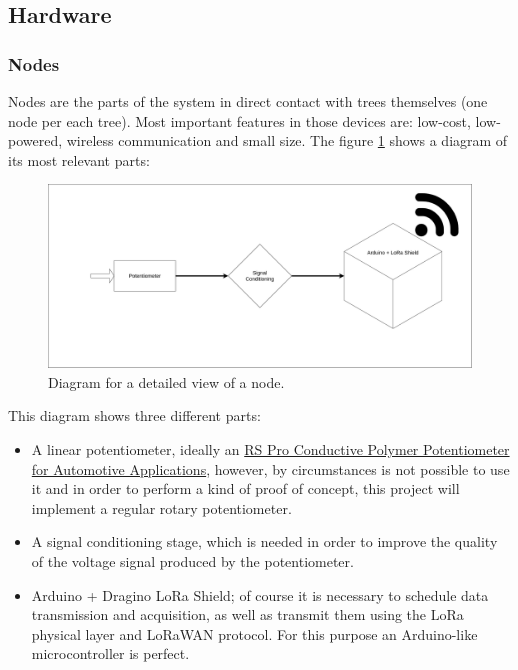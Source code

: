 \documentclass[11pt,a4paper,dvipsnames,twoside]{article}
\begin{document}
\subsection{Hardware}

\subsubsection{Nodes}
Nodes are the parts of the system in direct contact with trees themselves (one node per each tree). Most important features in those devices are: low-cost, low-powered, wireless communication and small size. The figure \ref{fig:NodeDiag} shows a diagram of its most relevant parts:

\begin{figure}[htp]
  \centering
  \includegraphics[width=.9\textwidth]{../schemes/node_tbg.png}
  \caption{Diagram for a detailed view of a node.}
  \label{fig:NodeDiag}
\end{figure}

This diagram shows three different parts:

\begin{itemize}
  \item A linear potentiometer, ideally an \href{https://docs.rs-online.com/37bf/0900766b814f0bd0.pdf}{RS Pro Conductive Polymer
  Potentiometer for Automotive Applications}, however, by circumstances is not possible to use it and in order to perform a kind of proof of concept, this project will implement a regular rotary potentiometer.
  \item A signal conditioning stage, which is needed in order to improve the quality of the voltage signal produced by the potentiometer.
  \item Arduino + Dragino LoRa Shield; of course it is necessary to schedule data transmission and acquisition, as well as transmit them using the LoRa physical layer and LoRaWAN protocol. For this purpose an Arduino-like microcontroller is perfect.
\end{itemize}
\end{document}
